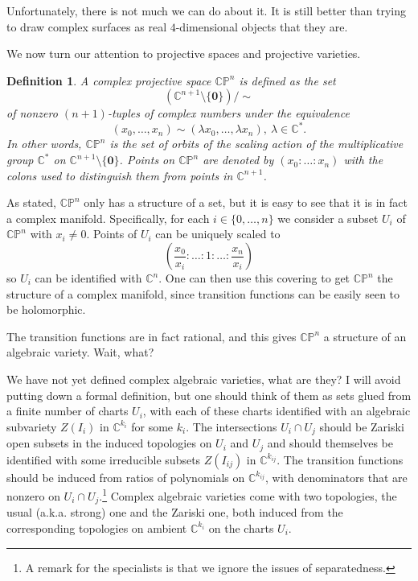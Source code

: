 \documentclass[11pt]{article}
\numberwithin{equation}{section}
\numberwithin{footnote}{section}
\newtheorem{defn}[thm]{Definition}
\newcommand{\blue}{\color{blue}}
\newcommand{\red}{\color{red}}
\renewcommand{\P}{{\mathbb P}}
\newcommand{\C}{{\mathbb C}}
\begin{document}
\noindent
Unfortunately, there is not much we can do about it. It is still better than trying to draw complex surfaces as real $4$-dimensional objects that they are.


\smallskip{\blue \hrule}
We now turn our attention to projective spaces and projective varieties.

\smallskip
\begin{defn}
A complex projective space $\C\P^n$ is defined as the set 
$$
(\C^{n+1}\setminus\{{\mathbf 0}\})/\sim
$$
of nonzero $(n+1)$-tuples of complex numbers under the equivalence
$$
(x_0,\ldots,x_n)\sim (\lambda x_0,\ldots,\lambda x_n), ~\lambda \in \C^*.
$$
In other words, $\C\P^n$ is the set of orbits of the scaling  action of the multiplicative group $\C^*$ on $\C^{n+1}\setminus\{{\mathbf 0}\}$.
Points on $\C\P^n$ are denoted by $(x_0:\ldots:x_n)$ with the colons used to distinguish them
from points in $\C^{n+1}$.
\end{defn}

As stated, $\C\P^n$ only has a structure of a set, but it is easy to see that it is in fact a complex manifold.
Specifically, for each $i\in \{0,\ldots,n\}$ we consider a subset $U_i$ of $\C\P^n$ with $x_i\neq 0$. Points of 
$U_i$ can be uniquely scaled to 
$$
\left(\frac {x_0}{x_i}:\ldots:1:\ldots: \frac{x_n}{x_i}\right)
$$
so $U_i$ can be identified with $\C^n$. One can then use this covering to get $\C\P^n$ the structure of a complex manifold, since transition functions can be easily seen to be holomorphic.

\smallskip
The transition functions are in fact rational, and this gives $\C\P^n$ a structure of an algebraic variety. {\red Wait, what?}

\smallskip
{\blue We have not yet defined complex algebraic varieties, what are they?} I will avoid putting down a formal definition, but one should think of them as sets glued from a finite number of charts $U_i$, with each of these charts identified 
with an algebraic subvariety $Z(I_i)$ in $\C^{k_i}$ for some $k_i$. The intersections $U_i\cap  U_j$ should be  
Zariski open subsets in the induced topologies on $U_i$ and $U_j$ and should themselves be identified with some 
irreducible subsets $Z(I_{ij})$ in $\C^{k_{ij}}$. The transition functions should be induced from ratios of polynomials on $\C^{k_{ij}}$,
with denominators that are nonzero on $U_i\cap U_j$.\footnote{ A remark for the specialists is that we ignore the issues of separatedness.} Complex algebraic varieties come with two topologies, the usual (a.k.a. strong) one and the Zariski one, both induced from the corresponding topologies on ambient $\C^{k_i}$ on the charts $U_i$.
\end{document}
